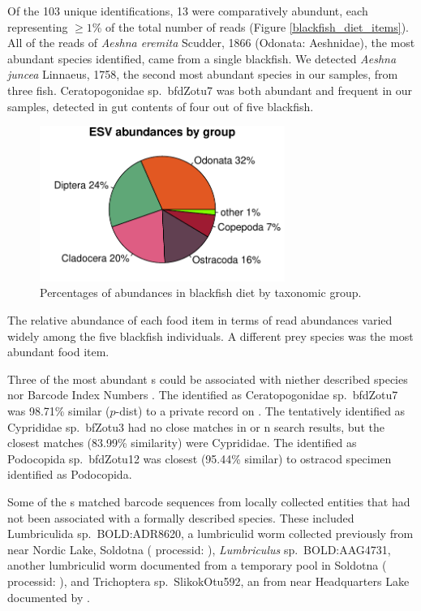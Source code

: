 \begin{multicols}{2}
Of the 103 unique identifications, 13 were comparatively abundunt, each representing $\geq 1$\% of the total number of reads (Figure \ref{blackfish_diet_items}). All of the reads of \textit{Aeshna eremita} Scudder, 1866 (Odonata: Aeshnidae), the most abundant species identified, came from a single blackfish. We detected \textit{Aeshna juncea} Linnaeus, 1758, the second most abundant species in our samples, from three fish. Ceratopogonidae sp.\ bfdZotu7 was both abundant and frequent in our samples, detected in gut contents of four out of five blackfish.

\begin{figure}[H]
\begin{center}
\vspace{2mm}
\includegraphics[width=8cm]{img/blackfish_pie_chart.pdf}
\caption{Percentages of  abundances in blackfish diet by taxonomic group.}
\label{blackfish_pie_chart}
\end{center}
\end{figure} 

The relative abundance of each food item in terms of read abundances varied widely among the five blackfish individuals. A different prey species was the most abundant food item.

Three of the most abundant s could be associated with niether described species nor  Barcode Index Numbers \citep{Ratnasinghametal2013}.  The  identified as Ceratopogonidae sp.\ bfdZotu7 was 98.71\% similar ($p$-dist) to a private record on . The  tentatively identified as Cyprididae sp.\ bfZotu3 had no close matches in  or n search results, but the closest matches (83.99\% similarity) were Cyprididae. The  identified as Podocopida sp.\ bfdZotu12 was closest (95.44\% similar) to ostracod specimen  identified as Podocopida.

Some of the s matched  barcode sequences from locally collected entities that had not been associated with a formally described species. These included Lumbriculida sp.\ BOLD:ADR8620, a lumbriculid worm collected previously from near Nordic Lake, Soldotna ( processid: ), \textit{Lumbriculus} sp.\ BOLD:AAG4731, another lumbriculid worm documented from a temporary pool in Soldotna ( processid: ), and Trichoptera sp.\ SlikokOtu592, an  from near Headquarters Lake documented by \citet{Bowseretal2020}.


\end{multicols}
